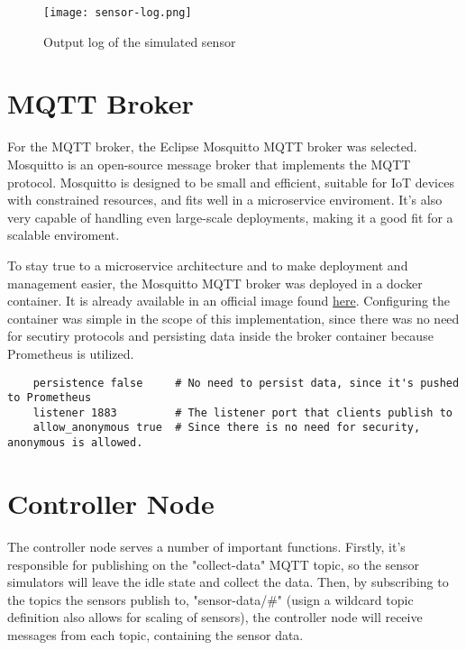 \begin{figure}[!h]
    \graphicspath{ {./screenshots/} }
    \texttt{[image: sensor-log.png]}
    \centering
    \caption{Output log of the simulated sensor }
    \label{fig:sensor_log}
\end{figure}

\section{MQTT Broker}
For the MQTT broker, the Eclipse Mosquitto MQTT broker was selected. Mosquitto is an open-source message broker that implements the MQTT protocol. Mosquitto is designed to be small and efficient, suitable for IoT devices with constrained resources, and fits well in a microservice enviroment. It's also very capable of handling even large-scale deployments, making it a good fit for a scalable enviroment.

To stay true to a microservice architecture and to make deployment and management easier, the Mosquitto MQTT broker was deployed in a docker container. It is already available in an official image found \href{https://hub.docker.com/_/eclipse-mosquitto}{here}. Configuring the container was simple in the scope of this implementation, since there was no need for secutiry protocols and persisting data inside the broker container because Prometheus is utilized.

\begin{verbatim}
    persistence false     # No need to persist data, since it's pushed to Prometheus
    listener 1883         # The listener port that clients publish to
    allow_anonymous true  # Since there is no need for security, anonymous is allowed.
\end{verbatim}

\section{Controller Node}
The controller node serves a number of important functions. Firstly, it's responsible for publishing on the "collect-data" MQTT topic, so the sensor simulators will leave the idle state and collect the data. Then, by subscribing to the topics the sensors publish to, "sensor-data/\#" (usign a wildcard topic definition also allows for scaling of sensors), the controller node will receive messages from each topic, containing the sensor data.

